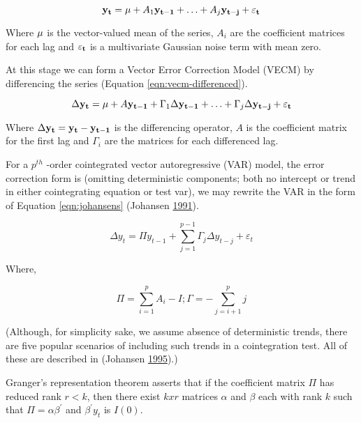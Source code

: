 \documentclass[
  12pt,
]{article}
\begin{document}
\begin{equation}
\label{eqn:var-general}
{\bf y_t} = {\bf \mu} + A_1 {\bf y_{t-1}} + \ldots + A_j {\bf y_{t-j}} + {\bf \varepsilon_t}
\end{equation}

Where \({\bf \mu}\) is the vector-valued mean of the series, \(A_i\) are the coefficient matrices for each lag and \({\bf \varepsilon_t}\) is a multivariate Gaussian noise term with mean zero.

At this stage we can form a Vector Error Correction Model (VECM) by differencing the series (Equation \ref{eqn:vecm-differenced}).

\begin{equation}
\label{eqn:vecm-differenced}
\Delta {\bf y_t} = {\bf \mu} + A {\bf y_{t-1}} + \Gamma_1 \Delta {\bf y_{t-1}} + \ldots + \Gamma_j \Delta {\bf y_{t-j}} + {\bf \varepsilon_t}
\end{equation}

Where \(\Delta {\bf y_t} = {\bf y_t} - {\bf y_{t-1}}\) is the differencing operator, \(A\) is the coefficient matrix for the first lag and \(\Gamma_i\) are the matrices for each differenced lag.

For a \(p^{th}\) -order cointegrated vector autoregressive (VAR) model, the error correction form is (omitting deterministic components; both no intercept or trend in either cointegrating equation or test var), we may rewrite the VAR in the form of Equation \ref{eqn:johansens} (Johansen \protect\hyperlink{ref-johansen1991estimation}{1991}).

\begin{equation}
\label{eqn:johansens}
\Delta y_t = \Pi y_{t-1} + \sum_{j = 1}^{p-1} {\Gamma_j \Delta y_{t-j}} + \varepsilon_t
\end{equation}

Where,

\[
\Pi = \sum^{p}_{i = 1}{A_{i}-I}; \Gamma = -\sum^{p}_{j = i + 1}{j}
\]

(Although, for simplicity sake, we assume absence of deterministic trends, there are five popular scenarios of including such trends in a cointegration test. All of these are described in (Johansen \protect\hyperlink{ref-johansen1995identifying}{1995}).)

Granger's representation theorem asserts that if the coefficient matrix \(\Pi\) has reduced rank \(r < k\), then there exist \(kxr\) matrices \(\alpha\) and \(\beta\) each with rank \(k\) such that \(\Pi = \alpha \beta^{\prime}\) and \(\beta^{\prime}y_t\) is \(I(0)\).
\end{document}
